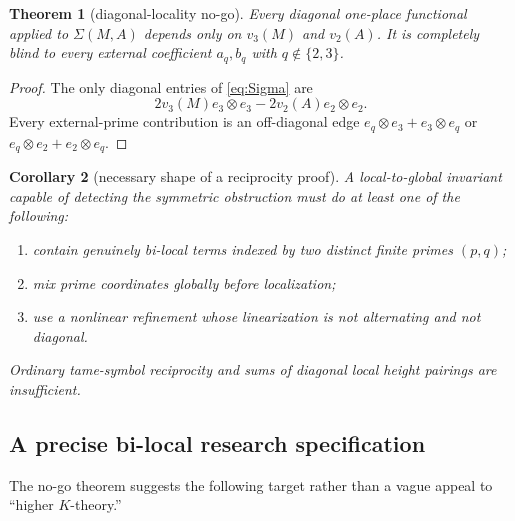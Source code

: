 \documentclass[11pt]{article}
\numberwithin{equation}{section}
\newtheorem{theorem}{Theorem}[section]
\newtheorem{corollary}[theorem]{Corollary}
\theoremstyle{definition}
\theoremstyle{remark}
\begin{document}
\begin{theorem}[diagonal-locality no-go]\label{thm:diagonalnogo}
Every diagonal one-place functional applied to $\Sigma(M,A)$ depends only on $v_3(M)$ and $v_2(A)$.  It is completely blind to every external coefficient $a_q,b_q$ with $q\notin\{2,3\}$.
\end{theorem}

\begin{proof}
The only diagonal entries of \eqref{eq:Sigma} are
\[
  2v_3(M)e_3\otimes e_3
  -2v_2(A)e_2\otimes e_2.
\]
Every external-prime contribution is an off-diagonal edge $e_q\otimes e_3+e_3\otimes e_q$ or $e_q\otimes e_2+e_2\otimes e_q$.
\end{proof}

\begin{corollary}[necessary shape of a reciprocity proof]\label{cor:bilocalnecessity}
A local-to-global invariant capable of detecting the symmetric obstruction must do at least one of the following:
\begin{enumerate}[label=(\roman*)]
  \item contain genuinely bi-local terms indexed by two distinct finite primes $(p,q)$;
  \item mix prime coordinates globally before localization;
  \item use a nonlinear refinement whose linearization is not alternating and not diagonal.
\end{enumerate}
Ordinary tame-symbol reciprocity and sums of diagonal local height pairings are insufficient.
\end{corollary}

\subsection{A precise bi-local research specification}

The no-go theorem suggests the following target rather than a vague appeal to ``higher $K$-theory.''
\end{document}
